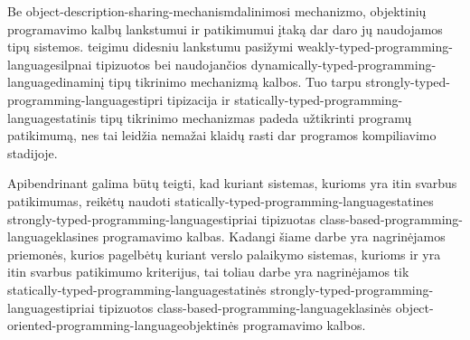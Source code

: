 Be \gls{object-description-sharing-mechanism}{dalinimosi mechanizmo},
objektinių programavimo kalbų lankstumui ir patikimumui įtaką
dar daro jų naudojamos tipų sistemos. \cite[2]{Madsen:1990:STO:97946.97964}
teigimu didesniu lankstumu pasižymi
\gls{weakly-typed-programming-language}{silpnai tipizuotos} bei
naudojančios \gls{dynamically-typed-programming-language}{dinaminį
tipų tikrinimo mechanizmą} kalbos. Tuo tarpu
\gls{strongly-typed-programming-language}{stipri tipizacija} ir
\gls{statically-typed-programming-language}{statinis tipų tikrinimo
mechanizmas} padeda užtikrinti programų patikimumą, nes tai
leidžia nemažai klaidų rasti dar programos kompiliavimo stadijoje.

Apibendrinant galima būtų teigti, kad kuriant sistemas, kurioms yra
itin svarbus patikimumas, reikėtų naudoti
\gls{statically-typed-programming-language}{statines}
\gls{strongly-typed-programming-language}{stipriai tipizuotas}
\gls{class-based-programming-language}{klasines} programavimo kalbas.
Kadangi šiame darbe yra nagrinėjamos priemonės, kurios pagelbėtų
kuriant verslo palaikymo sistemas, kurioms ir yra itin svarbus
patikimumo kriterijus, tai toliau darbe yra nagrinėjamos tik
\gls{statically-typed-programming-language}{statinės}
\gls{strongly-typed-programming-language}{stipriai tipizuotos}
\gls{class-based-programming-language}{klasinės}
\gls{object-oriented-programming-language}{objektinės} programavimo
kalbos.
